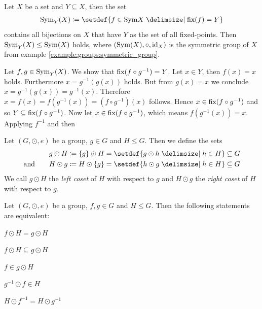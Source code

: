 \begin{examples}
    \begin{exampleenumerate}
        \item Let $X$ be a set and $Y\subseteq X$, then the set
        \begin{align}\symset_Y(X)\coloneq\setdef{f\in\symset X\given \fixset(f)=Y}\end{align}
        contains all bijections on $X$ that have $Y$ as the set of all fixed-points. Then $\text{Sym}_Y(X)\leq \text{Sym}(X)$ holds, where $(\text{Sym}(X), \circ, \text{id}_X)$ is the symmetric group of $X$ from example \ref{example:groups:symmetric_group}.

        \begin{miniproof}
            Let $f,g\in\text{Sym}_Y(X)$. We show that $\text{fix}(f\circ g^{-1})=Y$. Let $x\in Y$, then $f(x)=x$ holds. Furthermore $x=g^{-1}(g(x))$ holds. But from $g(x)=x$ we conclude $x=g^{-1}(g(x))=g^{-1}(x)$. Therefore $x=f(x)=f(g^{-1}(x))=(f\circ g^{-1})(x)$ follows. Hence $x\in\text{fix}(f\circ g^{-1})$ and so $Y\subseteq\text{fix}(f\circ g^{-1})$. Now let $x\in\text{fix}(f\circ g^{-1})$, which means $f(g^{-1}(x))=x$. Applying $f^{-1}$ and then
        \end{miniproof}
    \end{exampleenumerate}
\end{examples}

\begin{definition}[Cosets]
    Let $(G,\odot,e)$ be a group, $g\in G$ and $H\leq G$. Then we define the sets
    \begin{align}\begin{split}
    g\odot H&\coloneq \{g\}\odot H=\setdef{g\odot h\given h\in H}\subseteq G\\
    \text{and}\qquad H\odot g&\coloneq H\odot\{g\}=\setdef{h\odot g\given h\in H}\subseteq G
    \end{split}\end{align}
    We call $g\odot H$ the \emph{left coset} of $H$ with respect to $g$ and $H\odot g$ the \emph{right coset} of $H$ with respect to $g$.
\end{definition}

\begin{theorem}\label{theorem:groups:coset_equivalence}
    Let $(G,\odot,e)$ be a group, $f,g\in G$ and $H\leq G$. Then the following statements are equivalent:
    \begin{intheoremenumerate}
        \item $f\odot H=g\odot H$
        \item $f\odot H\subseteq g\odot H$
        \item $f\in g\odot H$
        \item $g^{-1}\odot f\in H$
        \item $H\odot f^{-1}=H\odot g^{-1}$
    \end{intheoremenumerate}
\end{theorem}

